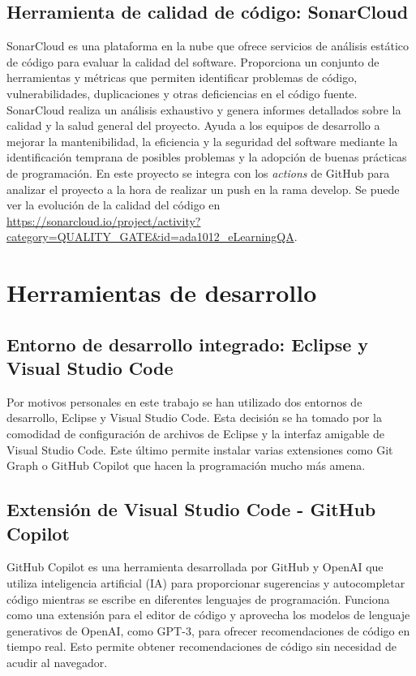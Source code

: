 \subsection{Herramienta de calidad de código: SonarCloud}
SonarCloud es una plataforma en la nube que ofrece servicios de análisis estático de código para evaluar la calidad del software. Proporciona un conjunto de herramientas y métricas que permiten identificar problemas de código, vulnerabilidades, duplicaciones y otras deficiencias en el código fuente. SonarCloud realiza un análisis exhaustivo y genera informes detallados sobre la calidad y la salud general del proyecto. Ayuda a los equipos de desarrollo a mejorar la mantenibilidad, la eficiencia y la seguridad del software mediante la identificación temprana de posibles problemas y la adopción de buenas prácticas de programación.
En este proyecto se integra con los \textit{actions} de GitHub para analizar el proyecto a la hora de realizar un push en la rama develop.
Se puede ver la evolución de la calidad del código en \url{https://sonarcloud.io/project/activity?category=QUALITY_GATE&id=ada1012_eLearningQA}.

\section{Herramientas de desarrollo}
\subsection{Entorno de desarrollo integrado: Eclipse y Visual Studio Code}
Por motivos personales en este trabajo se han utilizado dos entornos de desarrollo, Eclipse y Visual Studio Code. Esta decisión se ha tomado por la comodidad de configuración de archivos de Eclipse y la interfaz amigable de Visual Studio Code. Este último permite instalar varias extensiones como Git Graph o GitHub Copilot que hacen la programación mucho más amena.
\subsection{Extensión de Visual Studio Code - GitHub Copilot}
GitHub Copilot es una herramienta desarrollada por GitHub y OpenAI que utiliza inteligencia artificial (IA) para proporcionar sugerencias y autocompletar código mientras se escribe en diferentes lenguajes de programación. Funciona como una extensión para el editor de código y aprovecha los modelos de lenguaje generativos de OpenAI, como GPT-3, para ofrecer recomendaciones de código en tiempo real.
Esto permite obtener recomendaciones de código sin necesidad de acudir al navegador.
